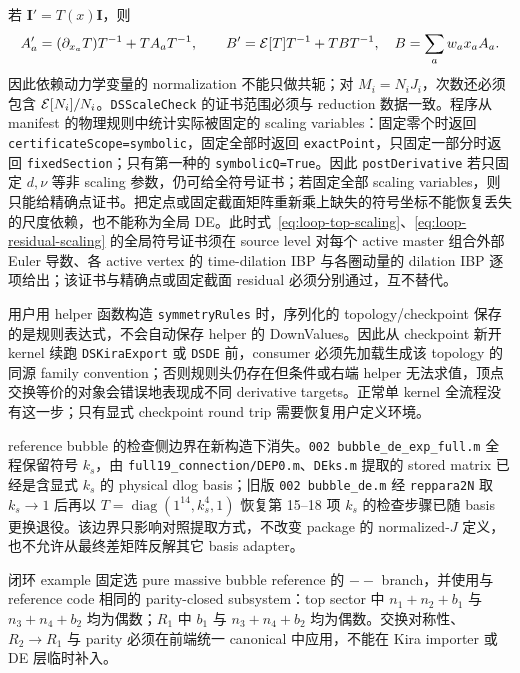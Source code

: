 ﻿\documentclass[a4paper,11pt]{article}
\begin{document}
若 $\bm I'=T(x)\bm I$，则
\begin{equation}
 A'_a=(\partial_{x_a}T)T^{-1}+TA_aT^{-1},\qquad
 B'={\cal E}[T]T^{-1}+TBT^{-1},
 \quad B=\sum_a w_a x_aA_a.
\end{equation}
因此依赖动力学变量的 normalization 不能只做共轭；对 $M_i=N_iJ_i$，次数还必须包含 ${\cal E}[N_i]/N_i$。\texttt{DSScaleCheck} 的证书范围必须与 reduction 数据一致。程序从 manifest 的物理规则中统计实际被固定的 scaling variables：固定零个时返回 \texttt{certificateScope=symbolic}，固定全部时返回 \texttt{exactPoint}，只固定一部分时返回 \texttt{fixedSection}；只有第一种的 \texttt{symbolicQ=True}。因此 \texttt{postDerivative} 若只固定 $d,\nu$ 等非 scaling 参数，仍可给全符号证书；若固定全部 scaling variables，则只能给精确点证书。把定点或固定截面矩阵重新乘上缺失的符号坐标不能恢复丢失的尺度依赖，也不能称为全局 DE。此时式~\eqref{eq:loop-top-scaling}、\eqref{eq:loop-residual-scaling} 的全局符号证书须在 source level 对每个 active master 组合外部 Euler 导数、各 active vertex 的 time-dilation IBP 与各圈动量的 dilation IBP 逐项给出；该证书与精确点或固定截面 residual 必须分别通过，互不替代。

用户用 helper 函数构造 \texttt{symmetryRules} 时，序列化的 topology/checkpoint 保存的是规则表达式，不会自动保存 helper 的 DownValues。因此从 checkpoint 新开 kernel 续跑 \texttt{DSKiraExport} 或 \texttt{DSDE} 前，consumer 必须先加载生成该 topology 的同源 family convention；否则规则头仍存在但条件或右端 helper 无法求值，顶点交换等价的对象会错误地表现成不同 derivative targets。正常单 kernel 全流程没有这一步；只有显式 checkpoint round trip 需要恢复用户定义环境。

reference bubble 的检查侧边界在新构造下消失。\texttt{002 bubble\_de\_exp\_full.m} 全程保留符号 $k_s$，由 \texttt{full19\_connection/DEP0.m}、\texttt{DEks.m} 提取的 stored matrix 已经是含显式 $k_s$ 的 physical dlog basis；旧版 \texttt{002 bubble\_de.m} 经 \texttt{reppara2N} 取 $k_s\to1$ 后再以 $T=\operatorname{diag}(1^{14},k_s^4,1)$ 恢复第 15--18 项 $k_s$ 的检查步骤已随 basis 更换退役。该边界只影响对照提取方式，不改变 package 的 normalized-$J$ 定义，也不允许从最终差矩阵反解其它 basis adapter。

闭环 example 固定选 pure massive bubble reference 的 $--$ branch，并使用与 reference code 相同的 parity-closed subsystem：top sector 中 $n_1+n_2+b_1$ 与 $n_3+n_4+b_2$ 均为偶数；$R_1$ 中 $b_1$ 与 $n_3+n_4+b_2$ 均为偶数。交换对称性、$R_2\to R_1$ 与 parity 必须在前端统一 canonical 中应用，不能在 Kira importer 或 DE 层临时补入。

\end{document}
